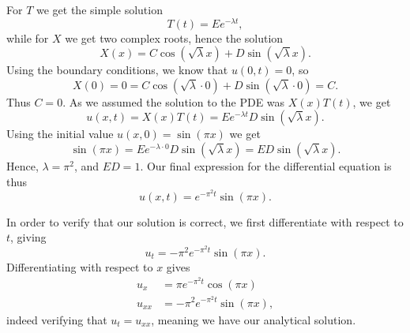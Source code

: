 \documentclass{article}
\theoremstyle{definition}
\begin{document}
For $T$ we get the simple solution
\begin{equation*}
    T(t) = E e^{-\lambda t},
\end{equation*}
while for $X$ we get two complex roots, hence the solution 
\begin{equation*}
    X(x) = C \cos\left(\sqrt{\lambda}x\right) + D \sin\left( \sqrt{\lambda}x \right).
\end{equation*}
Using the boundary conditions, we know that $u(0, t) = 0$, so
\begin{equation*}
    X(0) = 0 = C \cos\left(\sqrt{\lambda} \cdot 0\right) + D \sin\left( \sqrt{\lambda} \cdot 0 \right) = C.
\end{equation*}
Thus $C = 0$. As we assumed the solution to the PDE was $X(x) T(t)$, we get
\begin{equation*}
    u(x, t) = X(x) T(t) = E e^{-\lambda t} D \sin\left( \sqrt{\lambda} x \right).
\end{equation*}
Using the initial value $u(x, 0) = \sin(\pi x)$ we get
\begin{equation*}
    \sin(\pi x) = E e^{-\lambda \cdot 0} D\sin\left( \sqrt{\lambda}x \right) = ED \sin\left( \sqrt{\lambda}x \right).
\end{equation*}
Hence, $\lambda = \pi^2$, and $ED = 1$. Our final expression for the differential equation is thus
\begin{equation}
    u(x, t) = e^{-\pi^2 t} \sin(\pi x).
    \label{eq:analytical_sol}
\end{equation}

In order to verify that our solution is correct, we first differentiate with respect to $t$, giving
\begin{equation*}
    u_t = -\pi^2 e^{-\pi^2 t} \sin(\pi x).
\end{equation*}
Differentiating with respect to $x$ gives
\begin{align*}
    u_x &= \pi e^{-\pi^2 t} \cos(\pi x) \\
    u_{xx} &= -\pi^2 e^{-\pi^2 t} \sin(\pi x),
\end{align*}
indeed verifying that $u_{t} = u_{xx}$, meaning we have our analytical solution.
\end{document}
